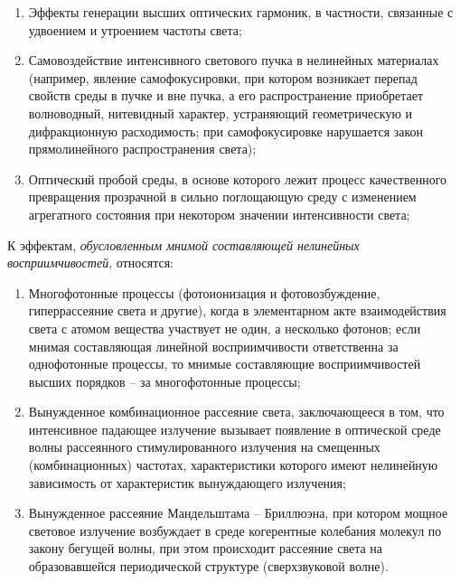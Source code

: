 \begin{enumerate}
\item  Эффекты генерации высших оптических гармоник, в частности, связанные с удвоением и утроением частоты света;
\item  Самовоздействие интенсивного светового пучка в нелинейных материалах (например, явление самофокусировки, при котором возникает перепад свойств среды в пучке и вне пучка, а его распространение приобретает волноводный, нитевидный характер, устраняющий геометрическую и дифракционную расходимость; при самофокусировке нарушается закон прямолинейного распространения света);
\item Оптический пробой среды, в основе которого лежит процесс качественного превращения прозрачной в сильно поглощающую среду с изменением агрегатного состояния при некотором значении интенсивности света;
\end{enumerate}
К эффектам, \textit{обусловленным мнимой составляющей нелинейных восприимчивостей}, относятся:
\begin{enumerate}
\item  Многофотонные процессы (фотоионизация и фотовозбуждение, гиперрассеяние света и другие), когда в элементарном акте взаимодействия света с атомом вещества участвует не один, а несколько фотонов; если мнимая составляющая линейной восприимчивости ответственна за однофотонные процессы, то мнимые составляющие восприимчивостей высших порядков – за многофотонные процессы;
\item  Вынужденное комбинационное рассеяние света, заключающееся в том, что интенсивное падающее излучение вызывает появление в оптической среде волны рассеянного стимулированного излучения на смещенных (комбинационных) частотах, характеристики которого имеют нелинейную зависимость от характеристик вынуждающего излучения;
\item Вынужденное рассеяние Мандельштама – Бриллюэна, при котором мощное световое излучение возбуждает в среде когерентные колебания молекул по закону бегущей волны, при этом происходит рассеяние света на образовавшейся периодической структуре (сверхзвуковой волне).
\end{enumerate}

